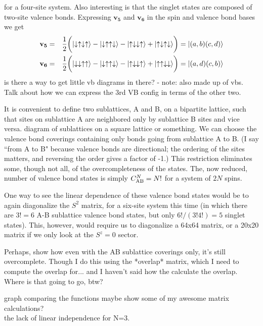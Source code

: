 for a four-site system.
Also interesting is that the singlet states are composed of two-site valence bonds. 
Expressing $\mathbf{v_5}$ and $\mathbf{v_6}$ in the spin and valence bond bases we get
\begin{eqnarray}
\mathbf{v_5} &=&\frac{1}{2}\bigg(\lvert \downarrow \uparrow \downarrow \uparrow \rangle - \lvert \downarrow \uparrow \uparrow \downarrow \rangle
			- \lvert \uparrow \downarrow \downarrow \uparrow \rangle + \lvert \uparrow \downarrow \uparrow \downarrow \rangle \bigg) 
			= \lvert(a,b)(c,d)\rangle\\
\mathbf{v_6} &=&\frac{1}{2}\bigg(\lvert \downarrow \downarrow \uparrow \uparrow \rangle - \lvert \downarrow \uparrow \uparrow \downarrow \rangle
			- \lvert \uparrow \downarrow \downarrow \uparrow \rangle + \lvert \uparrow \uparrow \downarrow \downarrow \rangle \bigg)
			= \lvert(a,d)(c,b)\rangle
\end{eqnarray}
{\color{red} is there a way to get little vb diagrams in there? - note: also made up of vbs.
Talk about how we can express the 3rd VB config in terms of the other two.}


It is convenient to define two sublattices, A and B, on a bipartite lattice, such that sites on 
sublattice A are neighbored only by sublattice B sites and vice versa. 
{\color{red} diagram of sublattices on a square lattice or something.}
We can choose the valence bond coverings containing only bonds going from sublattice A
to B.  (I say ``from A to B" because valence bonds are directional; the ordering of the
sites matters, and reversing the order gives a factor of -1.)
This restriction eliminates some, though not all, of the overcompleteness of the states.
The, now reduced, number of valence bond states is simply $C_{\rm{AB}}^N = N!$ for a system of $2N$ spins.

One way to see the linear dependence of these valence bond states would be to again diagonalize
the $S^2$ matrix, for a six-site system this time (in which there are $3!=6$ A-B sublattice
valence bond states, but only $6!/(3!4!) = 5$ singlet states).
This, however, would require us to diagonalize a 64x64 matrix, or a 20x20 matrix if we only look at
the $S^z=0$ sector.


{\color{red} Perhaps, show how even with the AB sublattice coverings only, it's still overcomplete.
Though I do this using the *overlap* matrix, which I need to compute the overlap for... and I haven't
said how the calculate the overlap.  Where is that going to go, btw?}


{\color{red} graph comparing the functions}
{\color{red} maybe show some of my awesome matrix calculations? \\ 
the lack of linear independence for N=3.}

